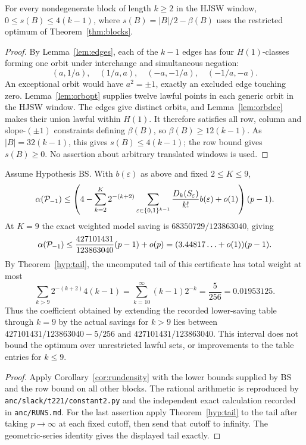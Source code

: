 \begin{theorem}\label{hyp:tail}
For every nondegenerate block of length $k\ge2$ in the HJSW window,
$0\le s(B)\le4(k-1)$, where $s(B)=|B|/2-\beta(B)$ uses the restricted optimum of Theorem~\ref{thm:blocks}.
\end{theorem}
\begin{proof}
By Lemma~\ref{lem:edges}, each of the $k-1$ edges has four $H(1)$-classes forming one orbit under interchange
and simultaneous negation:
\[
 (a,1/a),\quad(1/a,a),\quad(-a,-1/a),\quad(-1/a,-a).
\]
An exceptional orbit would have $a^2=\pm1$, exactly an excluded edge touching zero.
Lemma~\ref{lem:orbopt} supplies twelve lawful points in each generic orbit in the HJSW window.
The edges give distinct orbits, and Lemma~\ref{lem:orbdec} makes their union lawful within $H(1)$.
It therefore satisfies all row, column and slope-$(\pm1)$ constraints defining $\beta(B)$, so
$\beta(B)\ge12(k-1)$.  As $|B|=32(k-1)$, this gives $s(B)\le4(k-1)$;
the row bound gives $s(B)\ge0$.  No assertion about arbitrary translated windows is used.
\end{proof}

\begin{corollary}\label{cor:blockconst}
Assume Hypothesis BS.  With $b(\varepsilon)$ as above and fixed $2\le K\le9$,
\[
 \alpha(\mathcal{P}_{-1})\le\left(4-\sum_{k=2}^K2^{-(k+2)}
 \sum_{\varepsilon\in\{0,1\}^{k-1}}\frac{D_k(S_\varepsilon)}{k!}b(\varepsilon)+o(1)\right)(p-1).
\]
At $K=9$ the exact weighted model saving is $68350729/123863040$, giving
\[
 \alpha(\mathcal{P}_{-1})\le\frac{427101431}{123863040}(p-1)+o(p)
       =(3.44817\ldots+o(1))(p-1).
\]
By Theorem~\ref{hyp:tail}, the uncomputed tail of this certificate has total weight at most
\[
 \sum_{k>9}2^{-(k+2)}4(k-1)=\sum_{k=10}^\infty(k-1)2^{-k}
 =\frac5{256}=0.01953125.
\]
Thus the coefficient obtained by extending the recorded lower-saving table through $k=9$ by the actual savings for $k>9$ lies between
$427101431/123863040-5/256$ and $427101431/123863040$.
This interval does not bound the optimum over unrestricted lawful sets, or improvements to the table entries for $k\le9$.
\end{corollary}
\begin{proof}
Apply Corollary~\ref{cor:rundensity} with the lower bounds supplied by BS and the row bound on all other blocks.
The rational arithmetic is reproduced by \texttt{anc/slack/t221/constant2.py} and the independent exact calculation recorded in \texttt{anc/RUNS.md}.
For the last assertion apply Theorem~\ref{hyp:tail} to the tail after taking $p\to\infty$ at each fixed cutoff, then send that cutoff to infinity.
The geometric-series identity gives the displayed tail exactly.
\end{proof}

